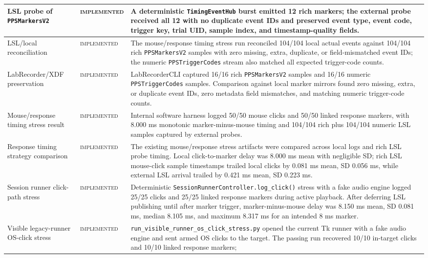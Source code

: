 \documentclass[11pt]{article}
\newcommand{\implemented}{\textsc{implemented}}
\begin{document}
\begin{longtable}{|p{}|p{}|p{}|}
\hline
LSL probe of \texttt{PPSMarkersV2} & \implemented{} & A deterministic
\texttt{TimingEventHub} burst emitted 12 rich markers; the external probe
received all 12 with no duplicate event IDs and preserved event type, event
code, trigger key, trial UID, sample index, and timestamp-quality fields. \\
\hline
LSL/local reconciliation & \implemented{} & The mouse/response timing stress
run reconciled 104/104 local actual events against 104/104 rich
\texttt{PPSMarkersV2} samples with zero missing, extra, duplicate, or
field-mismatched event IDs; the numeric \texttt{PPSTriggerCodes} stream also
matched all expected trigger-code counts. \\
\hline
LabRecorder/XDF preservation & \implemented{} & LabRecorderCLI captured 16/16
rich \texttt{PPSMarkersV2} samples and 16/16 numeric
\texttt{PPSTriggerCodes} samples. Comparison against local marker mirrors found
zero missing, extra, or duplicate event IDs, zero metadata field mismatches,
and matching numeric trigger-code counts. \\
\hline
Mouse/response timing stress result & \implemented{} & Internal software
harness logged 50/50 mouse clicks and 50/50 linked response markers, with
8.000 ms monotonic marker-minus-mouse timing and 104/104 rich plus 104/104
numeric LSL samples captured by external probes. \\
\hline
Response timing strategy comparison & \implemented{} & The existing
mouse/response stress artifacts were compared across local logs and rich LSL
probe timing. Local click-to-marker delay was 8.000 ms mean with negligible SD;
rich LSL mouse-click sample timestamps trailed local clicks by 0.081 ms mean,
SD 0.056 ms, while external LSL arrival trailed by 0.421 ms mean, SD 0.223 ms.
\\
\hline
Session runner click-path stress & \implemented{} & Deterministic
\texttt{SessionRunnerController.log\_click()} stress with a fake audio engine
logged 25/25 clicks and 25/25 linked response markers during active playback.
After deferring LSL publishing until after marker trigger, marker-minus-mouse
delay was 8.150 ms mean, SD 0.081 ms, median 8.105 ms, and maximum 8.317 ms for
an intended 8 ms marker. \\
\hline
Visible legacy-runner OS-click stress & \implemented{} &
\texttt{run\_visible\_runner\_os\_click\_stress.py} opened the current Tk
runner with a fake audio engine and sent armed OS clicks to the target. The
passing run recovered 10/10 in-target clicks and 10/10 linked response markers;

\end{longtable}
\end{document}
